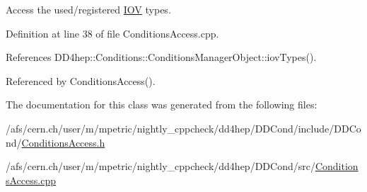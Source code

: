 Access the used/registered \hyperlink{class_d_d4hep_1_1_i_o_v}{I\+OV} types. 



Definition at line 38 of file Conditions\+Access.\+cpp.



References D\+D4hep\+::\+Conditions\+::\+Conditions\+Manager\+Object\+::iov\+Types().



Referenced by Conditions\+Access().



The documentation for this class was generated from the following files\+:\begin{DoxyCompactItemize}
\item 
/afs/cern.\+ch/user/m/mpetric/nightly\+\_\+cppcheck/dd4hep/\+D\+D\+Cond/include/\+D\+D\+Cond/\hyperlink{_conditions_access_8h}{Conditions\+Access.\+h}\item 
/afs/cern.\+ch/user/m/mpetric/nightly\+\_\+cppcheck/dd4hep/\+D\+D\+Cond/src/\hyperlink{_conditions_access_8cpp}{Conditions\+Access.\+cpp}\end{DoxyCompactItemize}
